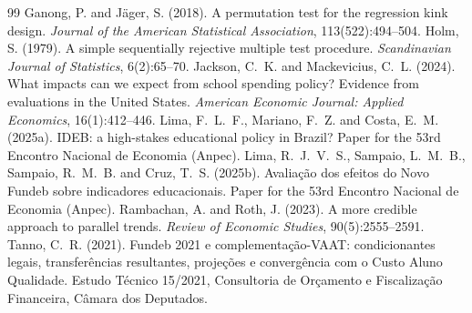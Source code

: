 \documentclass[11pt]{article}
\begin{document}
\begin{thebibliography}{99}
 Ganong, P. and J\"ager, S. (2018). A permutation test for the regression kink design. \textit{Journal of the American Statistical Association}, 113(522):494--504.
 Holm, S. (1979). A simple sequentially rejective multiple test procedure. \textit{Scandinavian Journal of Statistics}, 6(2):65--70.
 Jackson, C.~K. and Mackevicius, C.~L. (2024). What impacts can we expect from school spending policy? Evidence from evaluations in the United States. \textit{American Economic Journal: Applied Economics}, 16(1):412--446.
 Lima, F.~L.~F., Mariano, F.~Z. and Costa, E.~M. (2025a). IDEB: a high-stakes educational policy in Brazil? Paper for the 53rd Encontro Nacional de Economia (Anpec).
 Lima, R.~J.~V.~S., Sampaio, L.~M.~B., Sampaio, R.~M.~B. and Cruz, T.~S. (2025b). Avaliação dos efeitos do Novo Fundeb sobre indicadores educacionais. Paper for the 53rd Encontro Nacional de Economia (Anpec).
 Rambachan, A. and Roth, J. (2023). A more credible approach to parallel trends. \textit{Review of Economic Studies}, 90(5):2555--2591.
 Tanno, C.~R. (2021). Fundeb 2021 e complementação-VAAT: condicionantes legais, transferências resultantes, projeções e convergência com o Custo Aluno Qualidade. Estudo Técnico 15/2021, Consultoria de Orçamento e Fiscalização Financeira, Câmara dos Deputados.
\end{thebibliography}
\end{document}
